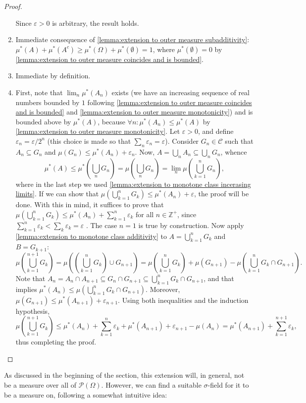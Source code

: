 \begin{proof}
\begin{enumerate}
		Since \(\varepsilon>0\) is arbitrary, the result holds.
		\item Immediate consequence of \ref{lemma:extension to outer measure subadditivity}:
\(\mu^*(A)+\mu^*(A^c)\geq\mu^*(\Omega)+\mu^*(\emptyset)=1\), where
\(\mu^{*}(\emptyset)=0\) by \ref{lemma:extension to outer measure coincides and
is bounded}.
		\item Immediate by definition.
		\item First, note that \(\lim_n \mu^*(A_n)\) exists (we have an
increasing sequence of real numbers bounded by \(1\) following
\ref{lemma:extension to outer measure coincides and is bounded} and
\ref{lemma:extension to outer measure monotonicity}) and is bounded above by
\(\mu^*(A)\), because \(\forall n:\mu^{*}(A_{n})\leq \mu^{*}(A)\) by
\ref{lemma:extension to outer measure monotonicity}. Let \(\varepsilon>0\), and
define \(\varepsilon_n=\varepsilon/2^n\) (this choice is made so that
\(\sum_n\varepsilon_n=\varepsilon\)). Consider \(G_n\in\mathcal{C}\) such that
\(A_n\subseteq G_n\) and \(\mu(G_n)\leq\mu^*(A_n)+\varepsilon_n\). Now,
\(A=\bigcup_nA_n\subseteq\bigcup_nG_n\), whence
		\[\mu^*(A)\leq\mu^*\left(\bigcup_nG_n\right)=\mu\left(\bigcup_nG_n\right)=\lim_n\mu\left(\bigcup_{k=1}^nG_n\right),\]
where in the last step we used \cref{lemma:extension to monotone class incerasing
limits}. If we can show that
\(\mu\left(\bigcup_{k=1}^nG_k\right)\leq\mu^*(A_n)+\varepsilon\), the proof will
be done. With this in mind, it suffices to prove that
\(\mu\left(\bigcup_{k=1}^nG_k\right)\leq\mu^*(A_n)+\sum_{k=1}^n\varepsilon_k\)
for all \(n\in\mathbb{Z}^+\), since
\(\sum_{k=1}^n\varepsilon_k<\sum_{k}\varepsilon_{k}=\varepsilon\) . The case
\(n=1\) is true by construction. Now apply \cref{lemma:extension to monotone class additivity} to \(A=\bigcup_{k=1}^n G_k\) and \(B=G_{k+1}\):
\[
    \mu\left(\bigcup_{k=1}^{n+1}G_k\right)=\mu\left(\left(\bigcup_{k=1}^nG_k\right)\cup G_{n+1}\right)=\mu\left(\bigcup_{k=1}^nG_k\right)+\mu(G_{n+1})-\mu\left(\bigcup_{k=1}^nG_k\cap G_{n+1}\right)
.\]
Note that
\(A_n=A_n\cap A_{n+1}\subseteq G_n\cap G_{n+1}\subseteq \bigcup_{k=1}^nG_k\cap G_{n+1}\),
and that implies
\(\mu^*(A_n)\leq\mu\left(\bigcup_{k=1}^nG_k\cap G_{n+1}\right)\). Moreover,
\(\mu(G_{n+1})\leq\mu^*(A_{n+1})+\varepsilon_{n+1}\). Using both inequalities
and the induction hypothesis,
		\[\mu\left(\bigcup_{k=1}^{n+1}G_k\right)\leq \mu^*(A_n)+\sum_{k=1}^n\varepsilon_k+\mu^*(A_{n+1})+\varepsilon_{n+1}-\mu(A_n)=\mu^*(A_{n+1})+\sum_{k=1}^{n+1}\varepsilon_k,\]
thus completing the proof.
	\end{enumerate}    
\end{proof}
As discussed in the beginning of the section, this extension will, in
general, not be a measure over all of \(\mathcal{P}(\Omega)\). However, we can
find a suitable \(\sigma\)-field for it to be a measure on, following a somewhat
intuitive idea:

